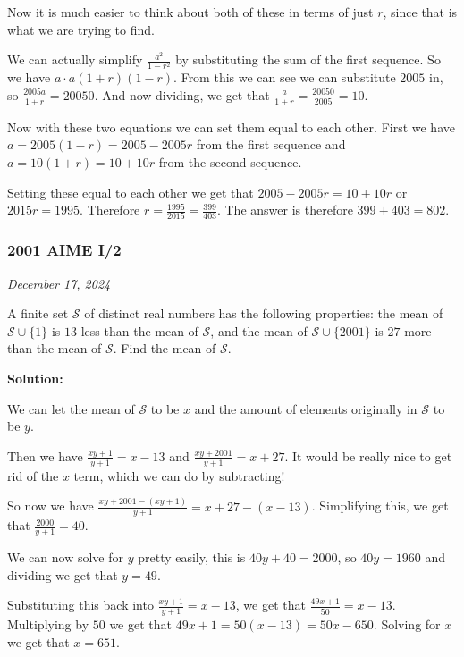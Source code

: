 \documentclass[../mathproblems.tex]{subfiles}
\begin{document}
Now it is much easier to think about both of these in terms of just $r$, since that is what we are trying to find.

We can actually simplify $\frac{a^2}{1-r^2}$ by substituting the sum of the first sequence. So we have ${a\cdot a}{(1+r)(1-r)}$. From this we can see we can substitute $2005$ in, so $\frac{2005a}{1+r} = 20050$. And now dividing, we get that $\frac{a}{1+r} = \frac{20050}{2005} = 10$.

Now with these two equations we can set them equal to each other. First we have $a = 2005(1-r) = 2005-2005r$ from the first sequence and $a = 10(1+r) = 10+10r$ from the second sequence. 

Setting these equal to each other we get that $2005-2005r=10+10r$ or $2015r = 1995$. Therefore $r=\frac{1995}{2015} = \frac{399}{403}$. The answer is therefore $399+403 = \boxed{802}$. 

\noindent\hrulefill

\subsubsection*{2001 AIME I/2}
\textit{December 17, 2024}

A finite set $\mathcal{S}$ of distinct real numbers has the following properties: the mean of $\mathcal{S}\cup\{1\}$ is $13$ less than the mean of $\mathcal{S}$, and the mean of $\mathcal{S}\cup\{2001\}$ is $27$ more than the mean of $\mathcal{S}$. Find the mean of $\mathcal{S}$. 

\textbf{Solution:}

We can let the mean of $\mathcal{S}$ to be $x$ and the amount of elements originally in $\mathcal{S}$ to be $y$. 

Then we have $\frac{xy+1}{y+1}=x-13$ and $\frac{xy+2001}{y+1} = x+27$. It would be really nice to get rid of the $x$ term, which we can do by subtracting!

So now we have $\frac{xy+2001-(xy+1)}{y+1}=x+27-(x-13)$. Simplifying this, we get that $\frac{2000}{y+1} = 40$.

We can now solve for $y$ pretty easily, this is $40y+40=2000$, so $40y=1960$ and dividing we get that $y=49$.

Substituting this back into $\frac{xy+1}{y+1} = x-13$, we get that $\frac{49x+1}{50} = x-13$. Multiplying by $50$ we get that $49x+1 = 50(x-13) = 50x-650$. Solving for $x$ we get that $x = \boxed{651}$.

\noindent\hrulefill
\end{document}
